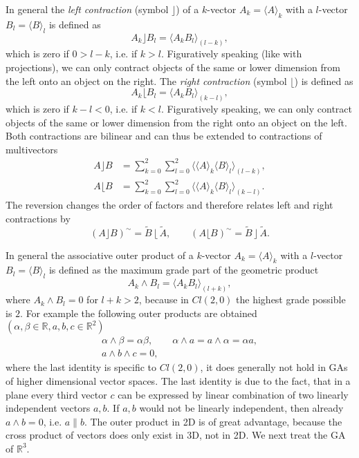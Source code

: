 \documentclass[cameraready]{jcmsi}%
\newcommand{\R}{\mathbb{R}}
\newcommand{\be}{\begin{equation}}
\newcommand{\ee}{\end{equation}}
\begin{document}
In general the \textit{left contraction} (symbol $\rfloor$) of a $k$-vector $A_k = \langle A \rangle_k$ with a $l$-vector 
$B_l = \langle B \rangle_l$ is defined as 
\be 
  A_k \rfloor B_l = \langle A_k B_l \rangle_{(l-k)} , 
\ee 
which is zero if $0>l-k$, i.e. if $k > l$. Figuratively speaking (like with projections), we can only contract objects of the same or lower dimension from the left onto an object on the right. 
The \textit{right contraction} (symbol $\lfloor$) is defined as
\be 
  A_k \lfloor B_l = \langle A_k B_l \rangle_{(k-l)} , 
\ee 
which is zero if $k-l < 0$, i.e. if $k < l$. Figuratively speaking, we can only contract objects of the same or lower dimension from the right onto an object on the left. Both contractions are bilinear and can thus be extended to contractions of multivectors
\begin{align}
  A \rfloor B &= \sum_{k=0}^2\sum_{l=0}^2 \langle \langle A \rangle_k \langle B \rangle_l \rangle_{(l-k)}, 
  \\
  A \lfloor B &= \sum_{k=0}^2\sum_{l=0}^2 \langle \langle A \rangle_k \langle B \rangle_l \rangle_{(k-l)}.
\end{align}
The reversion changes the order of factors and therefore relates left and right contractions by
\be 
  (A \rfloor B)^{\sim} = \widetilde{B} \,\lfloor \,\widetilde{A}, \qquad 
  (A \lfloor B)^{\sim} = \widetilde{B} \,\rfloor \,\widetilde{A}. 
\ee 

In general the associative outer product of a $k$-vector $A_k = \langle A \rangle_k$ with a $l$-vector $B_l = \langle B \rangle_l$ is defined as the maximum grade part of the geometric product
\be 
  A_k \wedge B_l = \langle A_k B_l \rangle_{(l+k)} , 
\ee 
where $A_k \wedge B_l=0$ for $l+k > 2$, because in $Cl(2,0)$ the highest grade possible is $2$. For example the following outer products are obtained $(\alpha, \beta \in \R, a,b,c \in \R^2)$
\begin{gather} 
  \alpha \wedge \beta = \alpha \beta, \qquad
  \alpha \wedge a = a \wedge \alpha = \alpha a, 
  \nonumber \\
  a \wedge b \wedge c = 0,  
\end{gather}  
where the last identity is specific to $Cl(2,0)$, it does generally not hold in GAs of higher dimensional vector spaces. The last identity is due to the fact, that in a plane every third vector $c$ can be expressed by linear combination of two linearly independent vectors $a,b$. If $a,b$ would not be linearly independent, then already $a\wedge b=0$, i.e. $a \parallel b$. The outer product in 2D is of great advantage, because the cross product of vectors does only exist in 3D, not in 2D. We next treat the GA of $\R^3$.
\end{document}
